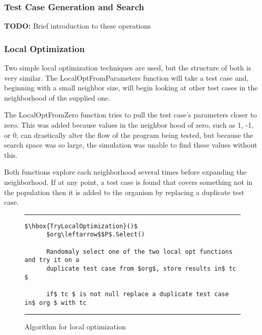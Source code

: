 \documentclass[runningheads]{llncs}
\begin{document}
\subsubsection{Test Case Generation and Search} 
\textbf{TODO:} Brief introduction to these operations


\FloatBarrier
\subsubsection{Local Optimization}

Two simple local optimization techniques are used, but the structure of both is very similar. The LocalOptFromParameters function will take a test case and, beginning with a small neighbor size, will begin looking at other test cases in the neighborhood of the supplied one. 

The LocalOptFromZero function tries to pull the test case's parameters closer to zero. This was added because values in the neighbor hood of zero, such as 1, -1, or 0, can drastically alter the flow of the program being tested, but because the search space was so large, the simulation was unable to find these values without this.

Both functions explore each neighborhood several times before expanding the neighborhood. If at any point, a test case is found that covers something not in the population then it is added to the organism by replacing a duplicate test case.


\begin{figure}[h!]
\begin{center}
\hrule
\medskip
\begin{Verbatim}[fontfamily=tt, xleftmargin=10pt, commandchars=\\\{\},
codes={\catcode`$=3\catcode`^=7\catcode`_=8}]
$\hbox{TryLocalOptimization}()$
      $org\leftarrow$$P$.Select()
		
      Randomaly select one of the two local opt functions and try it on a 
      duplicate test case from $org$, store results in$ tc $
		
      if$ tc $ is not null replace a duplicate test case in$ org $ with tc
\end{Verbatim}
\hrule
\end{center}
\caption{Algorithm for local optimization \label{fig:lcOpt}}
\end{figure}
\end{document}
